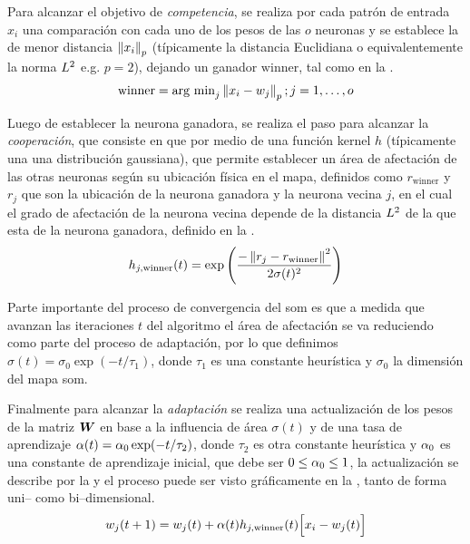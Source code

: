 Para alcanzar el objetivo de \emph{competencia}, se realiza por cada patrón de entrada $x_i$ una comparación con cada uno de los pesos de las $o$ neuronas y se establece la de menor distancia $\left\lVert x_i\right\rVert_p$ (típicamente la distancia Euclidiana o equivalentemente la norma $L^2$ e.g. $p = 2$), dejando un ganador $\mathrm{winner}$, tal como en la .
\begin{equation} \label{eq:som-competition}
  \mathrm{winner} = \text{arg min}_j \left\lVert x_i - w_j\right\rVert_p ; j = 1, \ldots,o
\end{equation}

Luego de establecer la neurona ganadora, se realiza el paso para alcanzar la \emph{cooperación}, que consiste en que por medio de una función kernel $h$ (típicamente una una distribución gaussiana), que permite establecer un área de afectación de las otras neuronas según su ubicación física en el mapa, definidos como $r_{\mathrm{winner}}$ y $r_j$ que son la ubicación de la neurona ganadora y la neurona vecina $j$, en el cual el grado de afectación de la neurona vecina depende de la distancia $L^2$ de la que esta de la neurona ganadora, definido en la .
\begin{equation} \label{eq:som-cooperation}
  h_{j, \mathrm{winner}}(t) = \exp\Bigg(\frac{- \left\lVert r_j - r_{\mathrm{winner}}\right\rVert^2}{ 2 \sigma(t)^2}\Bigg)
\end{equation}

Parte importante del proceso de convergencia del \gls{som} es que a medida que avanzan las iteraciones $t$ del algoritmo el área de afectación se va reduciendo como parte del proceso de adaptación, por lo que definimos $\sigma(t) = \sigma_0 \exp(-t / \tau_1)$, donde $\tau_1$ es una constante heurística y $\sigma_0$ la dimensión del mapa \gls{som}.

Finalmente para alcanzar la \emph{adaptación} se realiza una actualización de los pesos de la matriz ${\bm{W}}$ en base a la influencia de área $\sigma(t)$ y de una tasa de aprendizaje $\alpha(t) = \alpha_0 \exp(-t/ \tau_2)$, donde $\tau_2$ es otra constante heurística y $\alpha_0$ es una constante de aprendizaje inicial, que debe ser $0 \le \alpha_0 \le 1$, la actualización se describe por la  y el proceso puede ser visto gráficamente en la , tanto de forma uni-- como bi--dimensional.
\begin{equation} \label{eq:som-adaptation}
  w_j(t+1) = w_j(t) + \alpha(t) h_{j, \mathrm{winner}}(t)\Big[x_i-w_j(t)\Big]
\end{equation}

